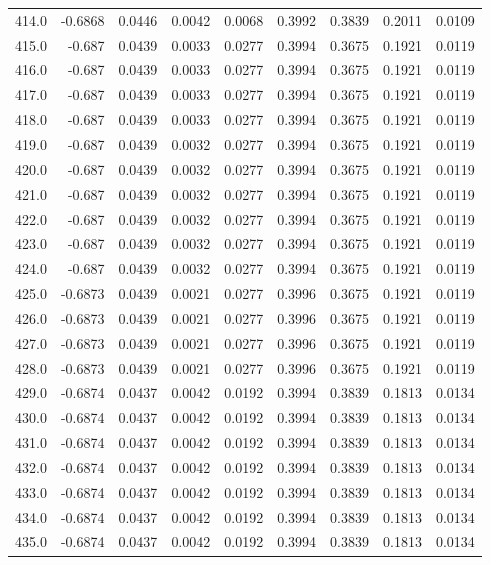\begin{longtable}{lrrrrrrrr}
414.0 & -0.6868 & 0.0446 & 0.0042 & 0.0068 & 0.3992 & 0.3839 & 0.2011 & 0.0109 \\
415.0 & -0.687 & 0.0439 & 0.0033 & 0.0277 & 0.3994 & 0.3675 & 0.1921 & 0.0119 \\
416.0 & -0.687 & 0.0439 & 0.0033 & 0.0277 & 0.3994 & 0.3675 & 0.1921 & 0.0119 \\
417.0 & -0.687 & 0.0439 & 0.0033 & 0.0277 & 0.3994 & 0.3675 & 0.1921 & 0.0119 \\
418.0 & -0.687 & 0.0439 & 0.0033 & 0.0277 & 0.3994 & 0.3675 & 0.1921 & 0.0119 \\
419.0 & -0.687 & 0.0439 & 0.0032 & 0.0277 & 0.3994 & 0.3675 & 0.1921 & 0.0119 \\
420.0 & -0.687 & 0.0439 & 0.0032 & 0.0277 & 0.3994 & 0.3675 & 0.1921 & 0.0119 \\
421.0 & -0.687 & 0.0439 & 0.0032 & 0.0277 & 0.3994 & 0.3675 & 0.1921 & 0.0119 \\
422.0 & -0.687 & 0.0439 & 0.0032 & 0.0277 & 0.3994 & 0.3675 & 0.1921 & 0.0119 \\
423.0 & -0.687 & 0.0439 & 0.0032 & 0.0277 & 0.3994 & 0.3675 & 0.1921 & 0.0119 \\
424.0 & -0.687 & 0.0439 & 0.0032 & 0.0277 & 0.3994 & 0.3675 & 0.1921 & 0.0119 \\
425.0 & -0.6873 & 0.0439 & 0.0021 & 0.0277 & 0.3996 & 0.3675 & 0.1921 & 0.0119 \\
426.0 & -0.6873 & 0.0439 & 0.0021 & 0.0277 & 0.3996 & 0.3675 & 0.1921 & 0.0119 \\
427.0 & -0.6873 & 0.0439 & 0.0021 & 0.0277 & 0.3996 & 0.3675 & 0.1921 & 0.0119 \\
428.0 & -0.6873 & 0.0439 & 0.0021 & 0.0277 & 0.3996 & 0.3675 & 0.1921 & 0.0119 \\
429.0 & -0.6874 & 0.0437 & 0.0042 & 0.0192 & 0.3994 & 0.3839 & 0.1813 & 0.0134 \\
430.0 & -0.6874 & 0.0437 & 0.0042 & 0.0192 & 0.3994 & 0.3839 & 0.1813 & 0.0134 \\
431.0 & -0.6874 & 0.0437 & 0.0042 & 0.0192 & 0.3994 & 0.3839 & 0.1813 & 0.0134 \\
432.0 & -0.6874 & 0.0437 & 0.0042 & 0.0192 & 0.3994 & 0.3839 & 0.1813 & 0.0134 \\
433.0 & -0.6874 & 0.0437 & 0.0042 & 0.0192 & 0.3994 & 0.3839 & 0.1813 & 0.0134 \\
434.0 & -0.6874 & 0.0437 & 0.0042 & 0.0192 & 0.3994 & 0.3839 & 0.1813 & 0.0134 \\
435.0 & -0.6874 & 0.0437 & 0.0042 & 0.0192 & 0.3994 & 0.3839 & 0.1813 & 0.0134 \\

\end{longtable}
